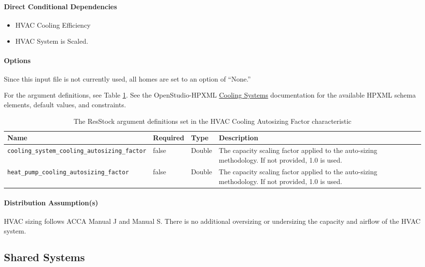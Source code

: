 \paragraph{Direct Conditional Dependencies}
\begin{itemize}
    \item HVAC Cooling Efficiency
    \item HVAC System is Scaled.
\end{itemize}

\paragraph{Options}
Since this input file is not currently used, all homes are set to an option of ``None.''

For the argument definitions, see Table \ref{table:hc_arg_def_hvac_cool_auto}. See the OpenStudio-HPXML \href{https://openstudio-hpxml.readthedocs.io/en/v1.8.1/workflow_inputs.html#hpxml-cooling-systems}{Cooling Systems} documentation for the available HPXML schema elements, default values, and constraints.

\begin{longtable}[]{|p{4cm}|p{2cm}|p{2cm}|p{4cm}|} \caption{The ResStock argument definitions set in the HVAC Cooling Autosizing Factor characteristic} \label{table:hc_arg_def_hvac_cool_auto}\\
\toprule\noalign{}
Name & Required & Type &  Description \\
\midrule\noalign{}
\endhead
\bottomrule\noalign{}
\endlastfoot
\texttt{cooling\_system\_cooling\_autosizing\_factor} & false &  Double
&  The capacity scaling factor applied to the auto-sizing methodology.
If not provided, 1.0 is used. \\
\hline
\texttt{heat\_pump\_cooling\_autosizing\_factor} & false &  Double & 
The capacity scaling factor applied to the auto-sizing methodology. If
not provided, 1.0 is used. \\
\end{longtable}
\paragraph{Distribution Assumption(s)}
HVAC sizing follows ACCA Manual J and Manual S. There is no additional oversizing or undersizing the capacity and airflow of the HVAC system. 

\subsection{Shared Systems} \label{sec:shared_systems}
